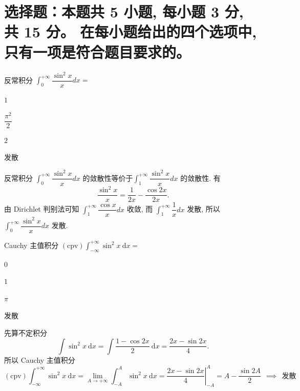 


\makeexamtitle



\section{%
  选择题：本题共 5 小题, 每小题 3 分, 共 15 分。
  在每小题给出的四个选项中, 只有一项是符合题目要求的。
}


\begin{question}
反常积分 $\int_0^{+\infty} \dfrac{\sin^2 x}{x} dx =$ \paren[D]

\begin{choices}
\item $1$
\item $\dfrac{\pi^2}{2}$
\item $2$
\item 发散
\end{choices}
\end{question}

\begin{solution}
反常积分 $\int_0^{+\infty} \dfrac{\sin^2 x}{x} dx$ 的敛散性等价于$\int_1^{+\infty} \dfrac{\sin^2 x}{x} dx$ 的敛散性. 有
\[
\dfrac{\sin^2 x}{x} = \dfrac{1}{2x} - \dfrac{\cos 2x}{2x}.
\]
由 Dirichlet 判别法可知 $\int_1^{+\infty} \dfrac{\cos x}{x} dx$ 收敛, 而 $\int_1^{+\infty} \dfrac{1}{x} dx$ 发散, 所以 $\int_0^{+\infty} \dfrac{\sin^2 x}{x} dx$ 发散.
\end{solution}


\begin{question}
Cauchy 主值积分 $\displaystyle (\text{cpv}) \int_{-\infty}^{+\infty} \sin^2 x ~ \mathrm{d}x =$ \paren[D]

\begin{choices}
\item $0$
\item $1$
\item $\pi$
\item 发散
\end{choices}
\end{question}

\begin{solution}
先算不定积分
\[
\int \sin^2 x ~ \mathrm{d}x = \int \frac{1 - \cos 2x}{2} ~ \mathrm{d}x = \frac{2x - \sin 2x}{4}.
\]
所以 Cauchy 主值积分
\[
(\text{cpv}) \int_{-\infty}^{+\infty} \sin^2 x ~ \mathrm{d}x = \lim_{A \to +\infty} \int_{-A}^{A} \sin^2 x ~ \mathrm{d}x = \left. \frac{2x - \sin 2x}{4} \right|_{-A}^{A} = A - \frac{\sin 2A}{2} ~~ \implies ~~ \text{发散}
\]
\end{solution}


